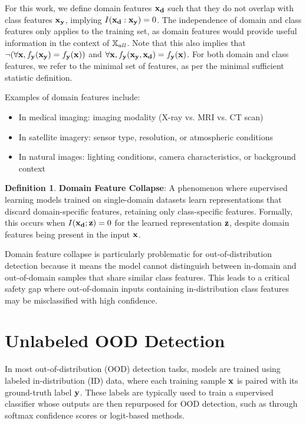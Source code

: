 \documentclass[11pt, oneside]{book}
\theoremstyle{plain}
\theoremstyle{definition}
\newtheorem{definition}[theorem]{Definition}
\theoremstyle{remark}
\begin{document}
For this work, we define domain features ${\mathbf{x}}_{\mathbf{d}}$ such that they do not overlap with class features ${\mathbf{x}}_{\mathbf{y}}$, implying $I({\mathbf{x}}_{\mathbf{d}}:{\mathbf{x}}_{\mathbf{y}}) = 0$. The independence of domain and class features only applies to the training set, as domain features would provide useful information in the context of ${\mathbb{X}}_{all}$. Note that this also implies that $\neg(\forall{\mathbf{x}},  f_{\mathbf{y}}({\mathbf{x}}_{\mathbf{y}}) = f_{\mathbf{y}}({\mathbf{x}}))$ and $\forall{\mathbf{x}}, f_{\mathbf{y}}({\mathbf{x}}_{\mathbf{y}}, {\mathbf{x}}_{\mathbf{d}}) = f_{\mathbf{y}}({\mathbf{x}})$. For both domain and class features, we refer to the minimal set of features, as per the minimal sufficient statistic definition.

Examples of domain features include:
\begin{itemize}
    \item In medical imaging: imaging modality (X-ray vs. MRI vs. CT scan)
    \item In satellite imagery: sensor type, resolution, or atmospheric conditions
    \item In natural images: lighting conditions, camera characteristics, or background context
\end{itemize}

\begin{definition}
\textbf{Domain Feature Collapse}: A phenomenon where supervised learning models trained on single-domain datasets learn representations that discard domain-specific features, retaining only class-specific features. Formally, this occurs when $I({\mathbf{x}}_{\mathbf{d}}; {\mathbf{z}}) = 0$ for the learned representation ${\mathbf{z}}$, despite domain features being present in the input ${\mathbf{x}}$.
\label{def:domainfeaturecollapse}
\end{definition}

Domain feature collapse is particularly problematic for out-of-distribution detection because it means the model cannot distinguish between in-domain and out-of-domain samples that share similar class features. This leads to a critical safety gap where out-of-domain inputs containing in-distribution class features may be misclassified with high confidence.

\section{Unlabeled OOD Detection}

In most out-of-distribution (OOD) detection tasks, models are trained using labeled in-distribution (ID) data, where each training sample \( {\mathbf{x}} \) is paired with its ground-truth label \( {\mathbf{y}} \). These labels are typically used to train a supervised classifier whose outputs are then repurposed for OOD detection, such as through softmax confidence scores or logit-based methods.
\end{document}
